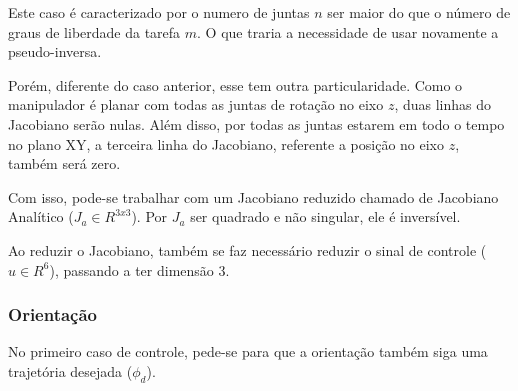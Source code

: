\documentclass[a4paper,11pt]{article}
\theoremstyle{mytheor}
\begin{document}
Este caso é caracterizado por o numero de juntas $n$ ser maior do que o número de graus de liberdade da tarefa $m$. O que traria a necessidade de usar novamente a pseudo-inversa.

Porém, diferente do caso anterior, esse tem outra particularidade. Como o manipulador é planar com todas as juntas de rotação no eixo $z$, duas linhas do Jacobiano serão nulas. Além disso, por todas as juntas estarem em todo o tempo no plano XY, a terceira linha do Jacobiano, referente a posição no eixo $z$, também será zero.

Com isso, pode-se trabalhar com um Jacobiano reduzido chamado de Jacobiano Analítico ($J_a \in R^{3x3}$). Por $J_a$ ser quadrado e não singular, ele é inversível.

Ao reduzir o Jacobiano, também se faz necessário reduzir o sinal de controle ($u \in R^{6}$), passando a ter dimensão 3.


\subsubsection{Orientação}

No primeiro caso de controle, pede-se para que a orientação também siga uma trajetória desejada ($\phi_d$).
\end{document}
